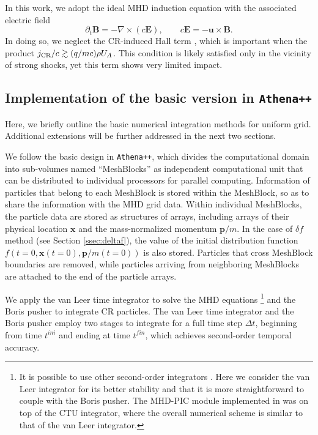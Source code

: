 \documentclass[fleqn,usenatbib]{mnras}
\begin{document}
In this work, we adopt the ideal MHD induction equation with the associated electric field
\begin{equation}
\partial_t \boldsymbol{B} =-\nabla \times (c\boldsymbol{E}),\qquad
	c\boldsymbol{E} = -\boldsymbol{u} \times \boldsymbol{B}. \label{equ::frozen_in}
\end{equation}
In doing so, we neglect the CR-induced Hall term \citep{2015ApJ...809...55B}, which is important when the product $j_{\rm CR}/c\gtrsim (q/mc)\rho U_A$. This condition is likely satisfied only in the vicinity of strong shocks, yet this term shows very limited impact.

\subsection{Implementation of the basic version in \texttt{Athena++}}
\label{sec::num_mhd-pic}
Here, we briefly outline the basic numerical integration methods for uniform grid. Additional extensions will be further addressed in the next two sections.

We follow the basic design in \texttt{Athena++}, which divides the computational domain into sub-volumes named ``MeshBlocks'' as independent computational unit that can be distributed to individual processors for parallel computing. 
Information of particles that belong to each MeshBlock is stored within the MeshBlock, so as to share the information with the MHD grid data. Within individual MeshBlocks, the particle data are stored as structures of arrays, including arrays of their physical location $\boldsymbol{x}$ and the mass-normalized momentum $\boldsymbol{p} / m$. In the case of $\delta f$ method (see Section \ref{ssec:deltaf}), the value of the initial distribution function $f\left(t=0, \boldsymbol{x}\left(t=0\right), \boldsymbol{p}/m\left(t=0\right)\right)$ is also stored. Particles that cross MeshBlock boundaries are removed, while particles arriving from neighboring MeshBlocks are attached to the end of the particle arrays.

We apply the van Leer time integrator \citep{2009NewA...14..139S} to solve the MHD equations \footnote{It is possible to use other second-order integrators \citep{2018ApJ...859...13M}. Here we consider the van Leer integrator for its better stability and that it is more straightforward to couple with the Boris pusher. The MHD-PIC module implemented in \citet{2015ApJ...809...55B} was on top of the CTU integrator, where the overall numerical scheme is similar to that of the van Leer integrator.} and the Boris pusher \citep{boris1972proceedings} to integrate CR particles. The van Leer time integrator and the Boris pusher employ two stages to integrate for a full time step $\Delta t$, beginning from time $t^{ini}$ and ending at time $t^{fin}$, which achieves second-order temporal accuracy. 
\end{document}
